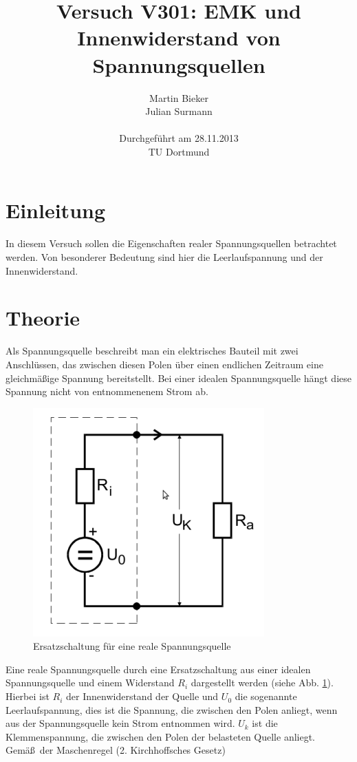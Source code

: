 \documentclass[11pt]{article}
\title{\textbf{Versuch V301: EMK und Innenwiderstand von Spannungsquellen}}
\author{Martin Bieker\\
		Julian Surmann\\
		\\
		Durchgef\"{u}hrt am 28.11.2013\\
		TU Dortmund}
\date{}
\begin{document}
\renewcommand\tablename{Tabelle}
\renewcommand\figurename{Abbildung}
\maketitle
\thispagestyle{empty}
\newpage
\clearpage
\setcounter{page}{1}

\section{Einleitung}
In diesem Versuch sollen die Eigenschaften realer Spannungsquellen betrachtet werden. Von besonderer Bedeutung sind hier die Leerlaufspannung und der Innenwiderstand.
\section{Theorie}
Als Spannungsquelle beschreibt man ein elektrisches Bauteil mit zwei Anschl\"ussen, das zwischen diesen Polen \"uber einen endlichen Zeitraum eine gleichm\"a\ss ige Spannung bereitstellt. Bei einer idealen Spannungsquelle h\"angt diese Spannung nicht von entnommenenem Strom ab.
\begin{figure}[htp]
\centering
\includegraphics[scale=1.00]{abb3.png}
\caption{Ersatzschaltung f\"ur eine reale Spannungsquelle}
\label{Ersatz}
\end{figure}
Eine reale Spannungsquelle durch eine Ersatzschaltung aus einer idealen Spannungsquelle und einem Widerstand $R_i$ dargestellt werden (siehe Abb. \ref{Ersatz}). Hierbei ist $R_i$ der Innenwiderstand der Quelle und  $U_0$ die sogenannte Leerlaufspannung, dies ist die Spannung, die zwischen den Polen anliegt, wenn aus der Spannungsquelle kein Strom entnommen wird. $U_k$ ist die Klemmenspannung, die zwischen den Polen der belasteten Quelle anliegt. Gem\"a\ss\ der Maschenregel (2. Kirchhoffsches Gesetz)
\end{document}
